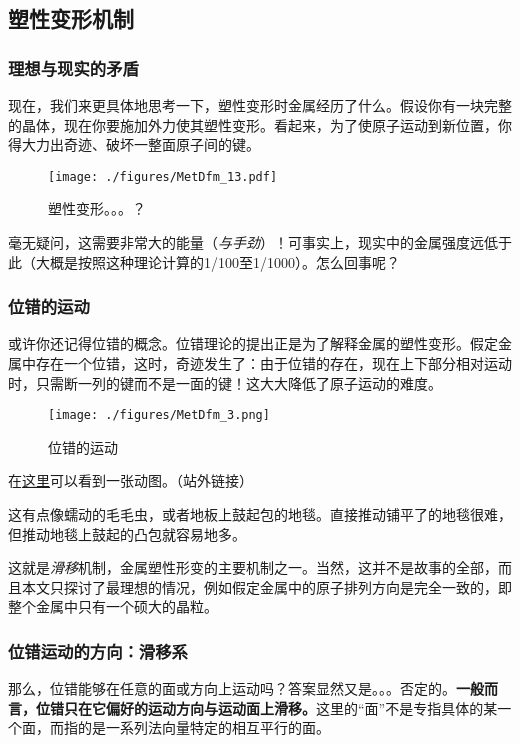 \subsection{塑性变形机制}

\subsubsection{理想与现实的矛盾}
现在，我们来更具体地思考一下，塑性变形时金属经历了什么。假设你有一块完整的晶体，现在你要施加外力使其塑性变形。看起来，为了使原子运动到新位置，你得大力出奇迹、破坏一整面原子间的键。
\begin{figure}[ht]
\centering
\texttt{[image: ./figures/MetDfm\_13.pdf]}
\caption{塑性变形。。。？} \label{MetDfm_fig13}
\end{figure}
毫无疑问，这需要非常大的能量（\textsl{与手劲}）！可事实上，现实中的金属强度远低于此（大概是按照这种理论计算的1/100至1/1000）。怎么回事呢？

\subsubsection{位错的运动}
或许你还记得位错的概念。位错理论的提出正是为了解释金属的塑性变形。假定金属中存在一个位错，这时，奇迹发生了：由于位错的存在，现在上下部分相对运动时，只需断一列的键而不是一面的键！这大大降低了原子运动的难度。
\begin{figure}[ht]
\centering
\texttt{[image: ./figures/MetDfm\_3.png]}
\caption{位错的运动} \label{MetDfm_fig3}
\end{figure}

在\href{https://m.sohu.com/a/350972084_120056486/}{这里}可以看到一张动图。（站外链接）

这有点像蠕动的毛毛虫，或者地板上鼓起包的地毯。直接推动铺平了的地毯很难，但推动地毯上鼓起的凸包就容易地多。

这就是\textsl{滑移}机制，金属塑性形变的主要机制之一。当然，这并不是故事的全部，而且本文只探讨了最理想的情况，例如假定金属中的原子排列方向是完全一致的，即整个金属中只有一个硕大的晶粒。

\subsubsection{位错运动的方向：滑移系}
那么，位错能够在任意的面或方向上运动吗？答案显然又是。。。否定的。\textbf{一般而言，位错只在它偏好的运动方向与运动面上滑移。}这里的“面”不是专指具体的某一个面，而指的是一系列法向量特定的相互平行的面。

